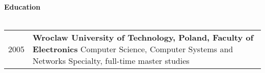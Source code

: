 \textbf{Education}
\\
\\
\begin{tabular}{p{}|p{}}
2005\textemdash2010
&
\textbf{Wroclaw University of Technology, Poland, Faculty of Electronics}\newline
Computer Science, Computer Systems and Networks Specialty, full-time master studies\\
\end{tabular}